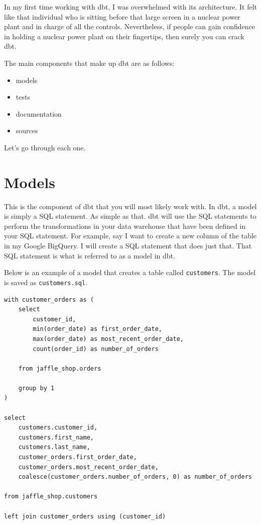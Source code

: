 \documentclass[
]{book}
\begin{document}
In my first time working with dbt, I was overwhelmed with its architecture. It felt like that individual who is sitting before that large screen in a nuclear power plant and in charge of all the controls. Nevertheless, if people can gain confidence in holding a nuclear power plant on their fingertips, then surely you can crack dbt.

The main components that make up dbt are as follows:

\begin{itemize}
\item
  models
\item
  tests
\item
  documentation
\item
  sources
\end{itemize}

Let's go through each one.

\hypertarget{models}{%
\section{Models}\label{models}}

This is the component of dbt that you will most likely work with. In dbt, a model is simply a SQL statement. As simple as that. dbt will use the SQL statements to perform the transformations in your data warehouse that have been defined in your SQL statement. For example, say I want to create a new column of the table in my Google BigQuery. I will create a SQL statement that does just that. That SQL statement is what is referred to as a model in dbt.

Below is an example of a model that creates a table called \texttt{customers}. The model is saved as \texttt{customers.sql}.

\begin{verbatim}
with customer_orders as (
    select
        customer_id,
        min(order_date) as first_order_date,
        max(order_date) as most_recent_order_date,
        count(order_id) as number_of_orders

    from jaffle_shop.orders

    group by 1
)

select
    customers.customer_id,
    customers.first_name,
    customers.last_name,
    customer_orders.first_order_date,
    customer_orders.most_recent_order_date,
    coalesce(customer_orders.number_of_orders, 0) as number_of_orders

from jaffle_shop.customers

left join customer_orders using (customer_id)
\end{verbatim}
\end{document}
